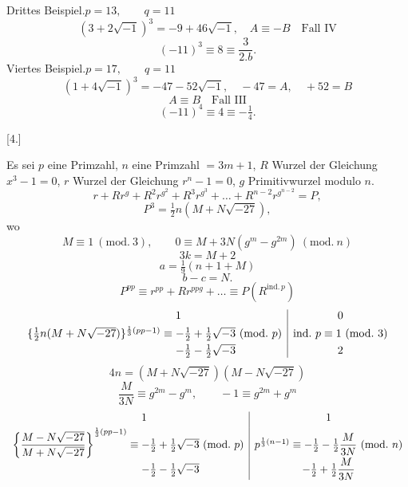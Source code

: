\noindent{}\hspace*{\parindent}Drittes Beispiel.\qquad $p=13,\qquad q=11$
\[(3+2\sqrt{-1})^3=-9+46\sqrt{-1},\quad A\equiv-B\quad\text{Fall IV}\]
\[(-11)^3\equiv8\equiv\dfrac{3}{2.b}.\]
\noindent\hspace*{\parindent}Viertes Beispiel.\qquad $p=17,\qquad q=11$
\[(1+4\sqrt{-1})^3=-47-52\sqrt{-1},\quad-47=A,\quad+52=B\]
\[A\equiv B\quad\text{Fall III}\]
\[(-11)^4\equiv4\equiv-\tfrac14.\]
\begin{center}[4.]\end{center}
\noindent\hspace*{\parindent}Es sei $p$ eine Primzahl, $n$ eine Primzahl $=3m+1$, $R$ Wurzel der Gleichung $x^3-1=0$, $r$ Wurzel der Gleichung $r^n-1=0$, $g$ Primitivwurzel modulo $n$.
\[r+Rr^g+R^2r^{g^2}+R^3r^{g^3}+\ldots+R^{n-2}r^{g^{n-2}}=P,\]
\[P^3=\tfrac12 n(M+N\sqrt{-27}),\]
\noindent wo
\[M\equiv1\ (\mathrm{mod.}\ 3),\qquad0\equiv M+3N(g^m-g^{2m})\ (\mathrm{mod.}\ n)\]
\[3k=M+2\]
\[a=\tfrac19(n+1+M)\]
\[b-c=N.\]
\[P^{pp}\equiv r^{pp}+Rr^{ppg}+\ldots\equiv P(R^{\mathrm{ind.}\,p})\]
\begingroup\footnotesize
\[\begin{array}{r@{}l|c}
&1&0\\[3pt]
\{\tfrac12 n(M+N\sqrt{-27})\}^{\frac13(pp-1)}\equiv{}&-\tfrac12+\tfrac12\sqrt{-3}\ (\mathrm{mod.}\ p)&\mathrm{ind.}\ p\equiv1\ (\mathrm{mod.}\ 3)\\[3pt]
&-\tfrac12-\tfrac12\sqrt{-3}&2
\end{array}\]
\endgroup
\[4n=(M+N\sqrt{-27})(M-N\sqrt{-27})\]
\[\dfrac{M}{3N}\equiv g^{2m}-g^m,\qquad-1\equiv g^{2m}+g^m\]
\begingroup\footnotesize
\[\begin{array}{r@{}l|c}
&1&1\\[3pt]
\left\{\dfrac{M-N\sqrt{-27}}{M+N\sqrt{-27}}\right\}^{\frac13(pp-1)}\equiv{}&-\tfrac12+\tfrac12\sqrt{-3}\ (\mathrm{mod.}\ p)&p^{\frac13(n-1)}\equiv-\tfrac12-\tfrac12\dfrac{M}{3N}\ (\mathrm{mod.}\ n)\\[5pt]
&-\tfrac12-\tfrac12\sqrt{-3}&-\tfrac12+\tfrac12\dfrac{M}{3N}
\end{array}\]
\endgroup
